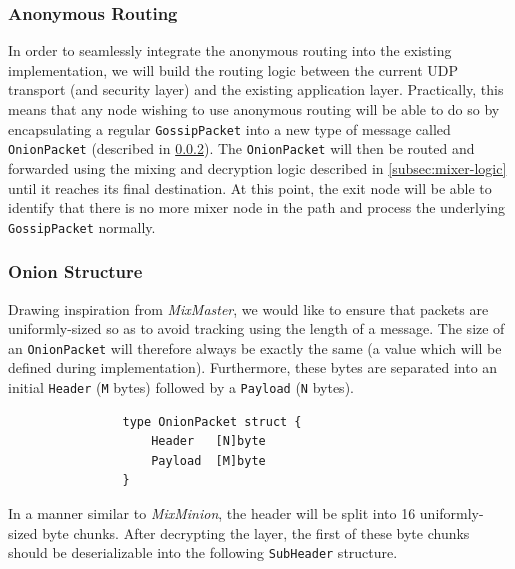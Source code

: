 \documentclass[11pt, a4paper]{article}
\begin{document}
        \subsubsection{Anonymous Routing}

            In order to seamlessly integrate the anonymous routing into the existing implementation, we will build the routing logic between the current UDP transport (and security layer) and the existing application layer.
            Practically, this means that any node wishing to use anonymous routing will be able to do so by encapsulating a regular \texttt{GossipPacket} into a new type of message called \texttt{OnionPacket} (described in \ref{subsec:onion-structure}).
            The \texttt{OnionPacket} will then be routed and forwarded using the mixing and decryption logic described in \ref{subsec:mixer-logic} until it reaches its final destination.
            At this point, the exit node will be able to identify that there is no more mixer node in the path and process the underlying \texttt{GossipPacket} normally.


        \subsubsection{Onion Structure}\label{subsec:onion-structure}

            Drawing inspiration from \textit{MixMaster}, we would like to ensure that packets are uniformly-sized so as to avoid tracking using the length of a message.
            The size of an \texttt{OnionPacket} will therefore always be exactly the same (a value which will be defined during implementation). Furthermore, these bytes are separated into an initial \texttt{Header} (\texttt{M} bytes) followed by a \texttt{Payload} (\texttt{N} bytes).

            \begin{lstlisting}
                type OnionPacket struct {
                    Header   [N]byte
                    Payload  [M]byte
                }
            \end{lstlisting}

            In a manner similar to \textit{MixMinion}, the header will be split into 16 uniformly-sized byte chunks.
            After decrypting the layer, the first of these byte chunks should be deserializable into the following \texttt{SubHeader} structure.
\end{document}
